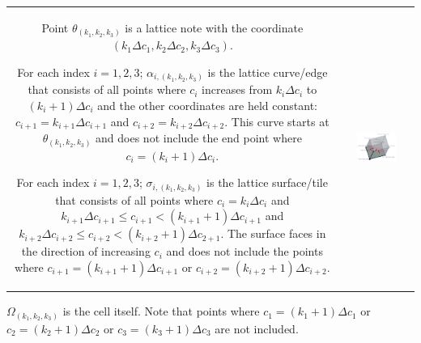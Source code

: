 \vspace{1mm}

\begin{tabular}{cc}
\parbox{0.4\textwidth}{
Point \(\theta_{(k_1, k_2, k_3)}\) is a lattice note with the coordinate \((k_1 \Delta c_1, k_2 \Delta c_2, k_3 \Delta c_3)\). 

\vspace{1mm}

For each index \(i = 1, 2, 3\); \(\alpha_{i, (k_1, k_2, k_3)}\) is the lattice curve/edge that consists of all points where \(c_i\) increases from \(k_i \Delta c_i\) to \((k_i + 1)\Delta c_i\) and the other coordinates are held constant: \(c_{i+1} = k_{i+1} \Delta c_{i+1}\) and \(c_{i+2} = k_{i+2} \Delta c_{i+2}\). This curve starts at \(\theta_{(k_1, k_2, k_3)}\) and does not include the end point where \(c_i = (k_i + 1)\Delta c_i\).

\vspace{1mm}

For each index \(i = 1, 2, 3\); \(\sigma_{i, (k_1, k_2, k_3)}\) is the lattice surface/tile that consists of all points where \(c_i = k_i \Delta c_i\) and \(k_{i+1} \Delta c_{i+1} \leq c_{i+1} < (k_{i+1} + 1) \Delta c_{i+1}\) and \(k_{i+2} \Delta c_{i+2} \leq c_{i+2} < (k_{i+2} + 1) \Delta c_{2+1}\). The surface faces in the direction of increasing \(c_i\) and does not include the points where \(c_{i+1} = (k_{i+1} + 1)\Delta c_{i + 1}\) or \(c_{i+2} = (k_{i+2} + 1)\Delta c_{i + 2}\).
} & \parbox{0.6\textwidth}{
\includegraphics[width = 0.6\textwidth]{Coordinate_systems/coordinate_system_cell_2}
}
\end{tabular}

\vspace{1mm}

\(\Omega_{(k_1, k_2, k_3)}\) is the cell itself. Note that points where \(c_1 = (k_1 + 1)\Delta c_1\) or \(c_2 = (k_2 + 1)\Delta c_2\) or \(c_3 = (k_3 + 1)\Delta c_3\) are not included.

